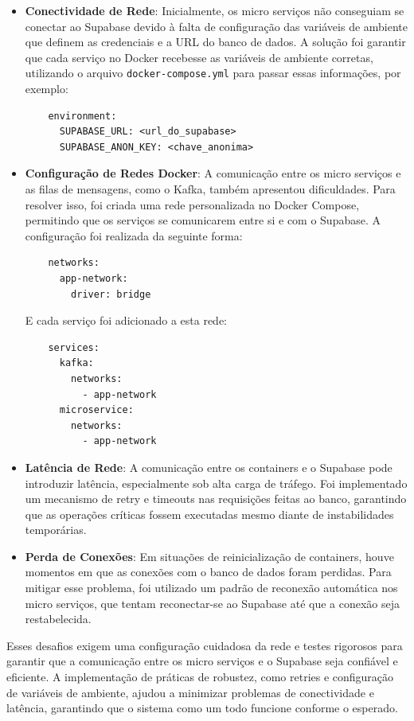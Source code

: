 \begin{itemize}
    \item \textbf{Conectividade de Rede}: Inicialmente, os micro serviços não conseguiam se conectar ao Supabase devido à falta de configuração das variáveis de ambiente que definem as credenciais e a URL do banco de dados. A solução foi garantir que cada serviço no Docker recebesse as variáveis de ambiente corretas, utilizando o arquivo \texttt{docker-compose.yml} para passar essas informações, por exemplo:
    \begin{verbatim}
    environment:
      SUPABASE_URL: <url_do_supabase>
      SUPABASE_ANON_KEY: <chave_anonima>
    \end{verbatim}

    \item \textbf{Configuração de Redes Docker}: A comunicação entre os micro serviços e as filas de mensagens, como o Kafka, também apresentou dificuldades. Para resolver isso, foi criada uma rede personalizada no Docker Compose, permitindo que os serviços se comunicarem entre si e com o Supabase. A configuração foi realizada da seguinte forma:
    \begin{verbatim}
    networks:
      app-network:
        driver: bridge
    \end{verbatim}

    E cada serviço foi adicionado a esta rede:
    \begin{verbatim}
    services:
      kafka:
        networks:
          - app-network
      microservice:
        networks:
          - app-network
    \end{verbatim}

    \item \textbf{Latência de Rede}: A comunicação entre os containers e o Supabase pode introduzir latência, especialmente sob alta carga de tráfego. Foi implementado um mecanismo de retry e timeouts nas requisições feitas ao banco, garantindo que as operações críticas fossem executadas mesmo diante de instabilidades temporárias.

    \item \textbf{Perda de Conexões}: Em situações de reinicialização de containers, houve momentos em que as conexões com o banco de dados foram perdidas. Para mitigar esse problema, foi utilizado um padrão de reconexão automática nos micro serviços, que tentam reconectar-se ao Supabase até que a conexão seja restabelecida.
\end{itemize}

Esses desafios exigem uma configuração cuidadosa da rede e testes rigorosos para garantir que a comunicação entre os micro serviços e o Supabase seja confiável e eficiente. A implementação de práticas de robustez, como retries e configuração de variáveis de ambiente, ajudou a minimizar problemas de conectividade e latência, garantindo que o sistema como um todo funcione conforme o esperado.

